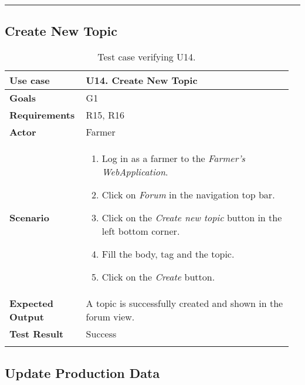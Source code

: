 \noindent\rule{\textwidth}{1pt} 

\subsection{Create New Topic}

\begin{longtable}{@{}p{0.25\linewidth}p{0.71\linewidth}@{}}
	\toprule
	\textbf{Use case} & \textbf{U14.} Create New Topic \\
	\midrule
	\textbf{Goals} & G1\\
	\midrule
	\textbf{Requirements} & R15, R16 \\
	\midrule
	\textbf{Actor} & Farmer\\
	\midrule
	\textbf{Scenario} & \begin{enumerate}[leftmargin=.4cm,noitemsep,topsep=0pt,before=\vspace{-3mm},after=\vspace{-4mm}]
		\item Log in as a farmer to the \textit{Farmer's WebApplication}.
		\item Click on \textit{Forum} in the navigation top bar.
		\item Click on the \textit{Create new topic} button in the left bottom corner.
		\item Fill the body, tag and the topic.
		\item Click on the \textit{Create} button.
	\end{enumerate}\\
	\midrule
	\textbf{Expected Output} & A topic is successfully created and shown in the forum view.\\
	\midrule
	\textbf{Test Result} & Success\\
	\bottomrule
	\caption{Test case verifying U14.}
\end{longtable}


\subsection{Update Production Data}

